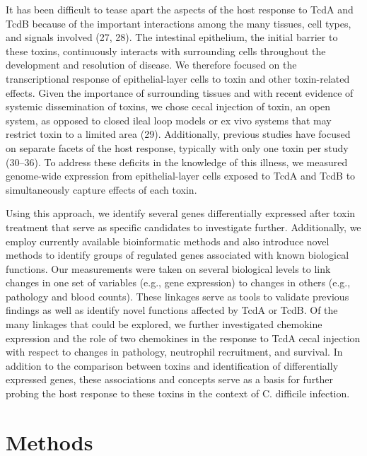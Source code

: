 It has been difficult to tease apart the aspects of the host response to TcdA and TcdB because of the important interactions among the many tissues, cell types, and signals involved (27, 28). The intestinal epithelium, the initial barrier to these toxins, continuously interacts with surrounding cells throughout the development and resolution of disease. We therefore focused on the transcriptional response of epithelial-layer cells to toxin and other toxin-related effects. Given the importance of surrounding tissues and with recent evidence of systemic dissemination of toxins, we chose cecal injection of toxin, an open system, as opposed to closed ileal loop models or ex vivo systems that may restrict toxin to a limited area (29). Additionally, previous studies have focused on separate facets of the host response, typically with only one toxin per study (30–36). To address these deficits in the knowledge of this illness, we measured genome-wide expression from epithelial-layer cells exposed to TcdA and TcdB to simultaneously capture effects of each toxin.

Using this approach, we identify several genes differentially expressed after toxin treatment that serve as specific candidates to investigate further. Additionally, we employ currently available bioinformatic methods and also introduce novel methods to identify groups of regulated genes associated with known biological functions. Our measurements were taken on several biological levels to link changes in one set of variables (e.g., gene expression) to changes in others (e.g., pathology and blood counts). These linkages serve as tools to validate previous findings as well as identify novel functions affected by TcdA or TcdB. Of the many linkages that could be explored, we further investigated chemokine expression and the role of two chemokines in the response to TcdA cecal injection with respect to changes in pathology, neutrophil recruitment, and survival. In addition to the comparison between toxins and identification of differentially expressed genes, these associations and concepts serve as a basis for further probing the host response to these toxins in the context of C. difficile infection.

\section{Methods}

